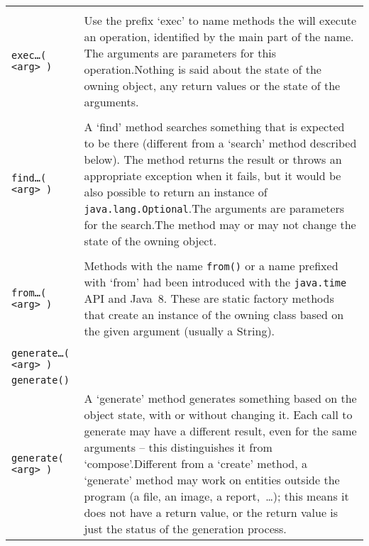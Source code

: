 \begin{longtable}{|l|X|}
    \makecell{\lstinline|exec…()| \\ \lstinline|exec…( <arg> )|} & Use the prefix ‘exec’ to name methods the will execute an operation, identified by the main part of the name. The arguments are parameters for this operation.\newline Nothing is said about the state of the owning object, any return values or the state of the arguments. \\
    \hline

    \makecell{\lstinline|find( <arg> )| \\ \lstinline|find…( <arg> )|} & A ‘find’ method searches something that is expected to be there (different from a ‘search’ method described below). The method returns the result or throws an appropriate exception when it fails, but it would be also possible to return an instance of \lstinline|java.lang.Optional|\autocite{ORACLE_DOC_OPTIONAL_CLASS}.\newline The arguments are parameters for the search.\newline The method may or may not change the state of the owning object. \\
    \hline

    \makecell{\lstinline|from( <arg> )| \\ \lstinline|from…( <arg> )|} & Methods with the name \lstinline|from()| or a name prefixed with ‘from’ had been introduced with the \lstinline|java.time| API and Java~8. These are static factory methods that create an instance of the owning class based on the given argument (usually a String). \\
    \hline

    \makecell{\lstinline|generate…()| \\ \lstinline|generate…( <arg> )| \\ \lstinline|generate()| \\ \lstinline|generate( <arg> )|} & A ‘generate’ method generates something based on the object state, with or without changing it. Each call to generate may have a different result, even for the same arguments – this distinguishes it from ‘compose’.\newline Different from a ‘create’ method, a ‘generate’ method may work on entities outside the program (a file, an image, a report,~…); this means it does not have a return value, or the return value is just the status of the generation process. \\
    \hline


\end{longtable}
